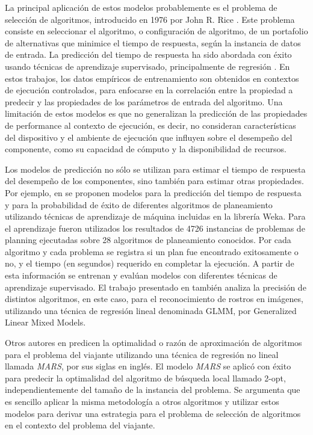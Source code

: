 La principal aplicación de estos modelos probablemente es el problema
de selección de algoritmos, introducido en 1976 por John R. Rice \citep{Rice1976}.
Este problema consiste en seleccionar el algoritmo, o configuración
de algoritmo, de un portafolio de alternativas que minimice el tiempo
de respuesta, según la instancia de datos de entrada. La predicción
del tiempo de respuesta ha sido abordada con éxito usando técnicas
de aprendizaje supervisado, principalmente de regresión \citep{Hutter2014}.
En estos trabajos, los datos empíricos de entrenamiento son obtenidos
en contextos de ejecución controlados, para enfocarse en la correlación
entre la propiedad a predecir y las propiedades de los parámetros
de entrada del algoritmo. Una limitación de estos modelos es que no
generalizan la predicción de las propiedades de performance al contexto
de ejecución, es decir, no consideran características del dispositivo
y el ambiente de ejecución que influyen sobre el desempeño del componente,
como su capacidad de cómputo y la disponibilidad de recursos. 

Los modelos de predicción no sólo se utilizan para estimar el tiempo
de respuesta del desempeño de los componentes, sino también para estimar
otras propiedades. Por ejemplo, en \citet{Roberts07learnedmodels}
se proponen modelos para la predicción del tiempo de respuesta y para
la probabilidad de éxito de diferentes algoritmos de planeamiento
utilizando técnicas de aprendizaje de máquina incluidas en la librería
Weka. Para el aprendizaje fueron utilizados los resultados de 4726
instancias de problemas de planning ejecutadas sobre 28 algoritmos
de planeamiento conocidos. Por cada algoritmo y cada problema se registra
si un plan fue encontrado exitosamente o no, y el tiempo (en segundos)
requerido en completar la ejecución. A partir de esta información
se entrenan y evalúan modelos con diferentes técnicas de aprendizaje
supervisado. El trabajo presentado en \citet{Beveridge2009} también
analiza la precisión de distintos algoritmos, en este caso, para el
reconocimiento de rostros en imágenes, utilizando una técnica de regresión
lineal denominada GLMM, por Generalized Linear Mixed Models. 

Otros autores en \citet{Mersmann_anovel} predicen la optimalidad
o razón de aproximación de algoritmos para el problema del viajante
utilizando una técnica de regresión no lineal llamada \emph{MARS},
por sus siglas en inglés. El modelo \emph{MARS} se aplicó con éxito
para predecir la optimalidad del algoritmo de búsqueda local llamado
2-opt, independientemente del tamaño de la instancia del problema.
Se argumenta que es sencillo aplicar la misma metodología a otros
algoritmos y utilizar estos modelos para derivar una estrategia para
el problema de selección de algoritmos en el contexto del problema
del viajante.

